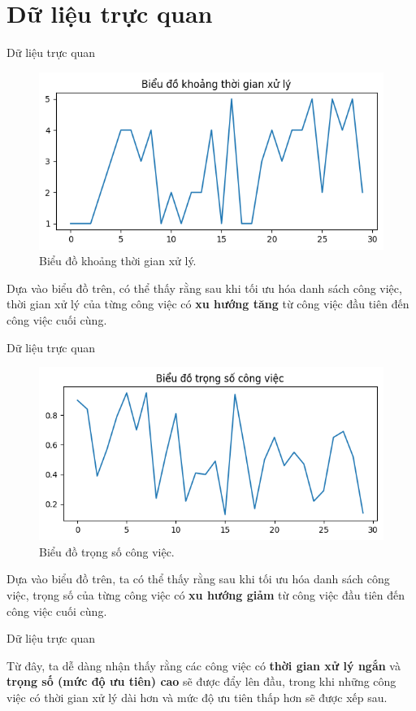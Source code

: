 \documentclass[10pt]{beamer}
\begin{document}
\section*{Dữ liệu trực quan}

\begin{frame}{Dữ liệu trực quan}
\begin{figure}[h]
\centering
\includegraphics[width=0.7\linewidth]{output_p.png}
\caption{Biểu đồ khoảng thời gian xử lý.}
\end{figure}

Dựa vào biểu đồ trên, có thể thấy rằng sau khi tối ưu hóa danh sách công việc, thời gian xử lý của từng công việc có \textbf{xu hướng tăng} từ công việc đầu tiên đến công việc cuối cùng.
\end{frame}

\begin{frame}{Dữ liệu trực quan}
\begin{figure}[h]
\centering
\includegraphics[width=0.7\linewidth]{output_w.png}
\caption{Biểu đồ trọng số công việc.}
\end{figure}

Dựa vào biểu đồ trên, ta có thể thấy rằng sau khi tối ưu hóa danh sách công việc, trọng số của từng công việc có \textbf{xu hướng giảm} từ công việc đầu tiên đến công việc cuối cùng.
\end{frame}

\begin{frame}{Dữ liệu trực quan}

Từ đây, ta dễ dàng nhận thấy rằng các công việc có \textbf{thời gian xử lý ngắn} và \textbf{trọng số (mức độ ưu tiên) cao} sẽ được đẩy lên đầu, trong khi những công việc có thời gian xử lý dài hơn và mức độ ưu tiên thấp hơn sẽ được xếp sau.
\end{frame}
\end{document}
